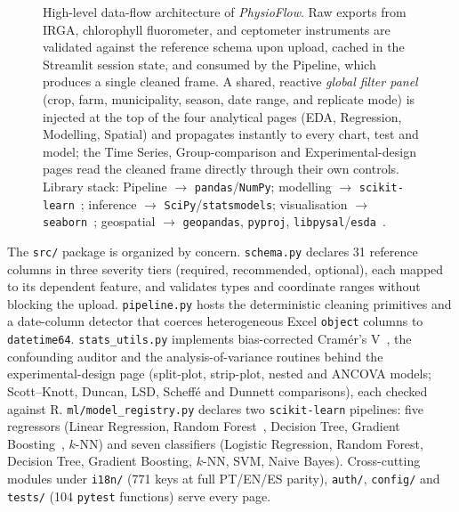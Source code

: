 \documentclass[preprint,12pt,a4paper]{elsarticle}
\begin{document}
\begin{figure}[!htb]
{%
}
\caption{High-level data-flow architecture of \emph{PhysioFlow}. Raw exports from IRGA, chlorophyll fluorometer, and ceptometer instruments are validated against the reference schema upon upload, cached in the Streamlit session state, and consumed by the Pipeline, which produces a single cleaned frame. A shared, reactive \emph{global filter panel} (crop, farm, municipality, season, date range, and replicate mode) is injected at the top of the four analytical pages (EDA, Regression, Modelling, Spatial) and propagates instantly to every chart, test and model; the Time Series, Group-comparison and Experimental-design pages read the cleaned frame directly through their own controls. Library stack: Pipeline $\to$ \texttt{pandas}/\texttt{NumPy}; modelling $\to$ \texttt{scikit-learn}~\cite{Pedregosa2011}; inference $\to$ \texttt{SciPy}/\texttt{statsmodels}; visualisation $\to$ \texttt{seaborn}~\cite{Waskom2021,Hunter2007}; geospatial $\to$ \texttt{geopandas}, \texttt{pyproj}, \texttt{libpysal}/\texttt{esda}~\cite{Rey2010Pysal}.}\label{fig:architecture}
\end{figure}

The \texttt{src/} package is organized by concern. \texttt{schema.py} declares 31 reference columns in three severity tiers (required, recommended, optional), each mapped to its dependent feature, and validates types and coordinate ranges without blocking the upload. \texttt{pipeline.py} hosts the deterministic cleaning primitives and a date-column detector that coerces heterogeneous Excel \texttt{object} columns to \texttt{datetime64}. \texttt{stats\_utils.py} implements bias-corrected Cram\'er's V~\cite{Bergsma2013}, the confounding auditor and the analysis-of-variance routines behind the experimental-design page (split-plot, strip-plot, nested and ANCOVA models; Scott--Knott, Duncan, LSD, Scheff\'e and Dunnett comparisons), each checked against R. \texttt{ml/model\_registry.py} declares two \texttt{scikit-learn} pipelines: five regressors (Linear Regression, Random Forest~\cite{Breiman2001}, Decision Tree, Gradient Boosting~\cite{Friedman2001}, $k$-NN) and seven classifiers (Logistic Regression, Random Forest, Decision Tree, Gradient Boosting, $k$-NN, SVM, Naive Bayes). Cross-cutting modules under \texttt{i18n/} (771 keys at full PT/EN/ES parity), \texttt{auth/}, \texttt{config/} and \texttt{tests/} (104 \texttt{pytest} functions) serve every page.
\end{document}
